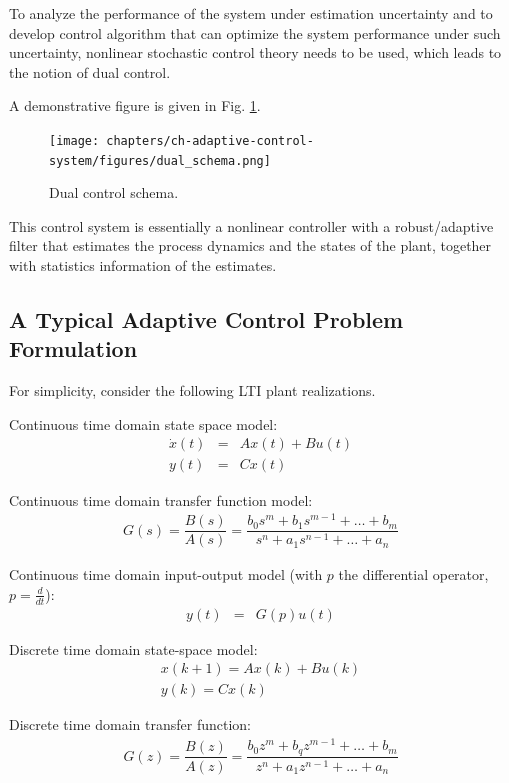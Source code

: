 To analyze the performance of the system under estimation uncertainty and to develop control algorithm that can optimize the system performance under such uncertainty, nonlinear stochastic control theory needs to be used, which leads to the notion of dual control.

A demonstrative figure is given in Fig. \ref{ch:acs:fig:dual_schema}.

\begin{figure}
	\centering
	\texttt{[image: chapters/ch-adaptive-control-system/figures/dual\_schema.png]}
	\caption{Dual control schema.} \label{ch:acs:fig:dual_schema}
\end{figure}

This control system is essentially a nonlinear controller with a robust/adaptive filter that estimates the process dynamics and the states of the plant, together with statistics information of the estimates.

\subsection{A Typical Adaptive Control Problem Formulation}

For simplicity, consider the following LTI plant realizations.

Continuous time domain state space model:
\begin{eqnarray}
	\dot{x}(t) &=& Ax(t) + Bu(t) \nonumber \\
	y(t) &=& Cx(t) \nonumber
\end{eqnarray}

Continuous time domain transfer function model:
\begin{eqnarray}
	G(s) = \dfrac{B(s)}{A(s)} = \dfrac{b_0s^m + b_1s^{m-1} + \ldots + b_m}{s^n + a_1s^{n-1} + \ldots + a_n} \nonumber
\end{eqnarray}

Continuous time domain input-output model (with $p$ the differential operator, $p=\frac{d}{dt}$):
\begin{eqnarray}
	y(t) &=& G(p)u(t) \nonumber
\end{eqnarray}

Discrete time domain state-space model:
\begin{eqnarray}
	x(k+1) = Ax(k) + Bu(k) \nonumber \\
	y(k) = Cx(k) \nonumber
\end{eqnarray}

Discrete time domain transfer function:
\begin{eqnarray}
	G(z) = \dfrac{B(z)}{A(z)} = \dfrac{b_0z^m + b_qz^{m-1} + \ldots + b_m}{z^n + a_1z^{n-1} + \ldots + a_n} \nonumber
\end{eqnarray}

